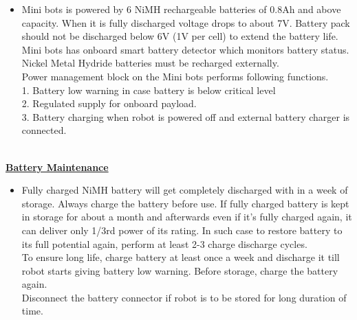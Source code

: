 \documentclass[a4paper,12pt,oneside]{book}
\begin{document}
	\begin{itemize}
	\item {Mini bots is powered by 6 NiMH rechargeable batteries of 0.8Ah and above capacity. When it is
	fully discharged voltage drops to about 7V. Battery pack should not be discharged below 6V (1V
	per cell) to extend the battery life. Mini bots has onboard smart battery detector which monitors
	battery status. Nickel Metal Hydride batteries must be recharged externally.\\
	Power management block on the Mini bots performs following functions.\\
	1. Battery low warning in case battery is below critical level\\
	2. Regulated supply for onboard payload.\\
	3. Battery charging when robot is powered off and external battery charger is
	connected.\\}
	\end{itemize}
	\hfill\\	
	\underline{\textbf{\Large{Battery Maintenance}}}
	\begin{itemize}
		\item {Fully charged NiMH battery will get completely discharged with in a week of storage. Always
			charge the battery before use. If fully charged battery is kept in storage for about a month and
			afterwards even if it’s fully charged again, it can deliver only 1/3rd power of its rating. In such
			case to restore battery to its full potential again, perform at least 2-3 charge discharge cycles.\\
			To ensure long life, charge battery at least once a week and discharge it till robot starts giving
			battery low warning. Before storage, charge the battery again.\\
			Disconnect the battery connector if robot is to be stored for long duration of time.}
	\end{itemize}
	
\end{document}
